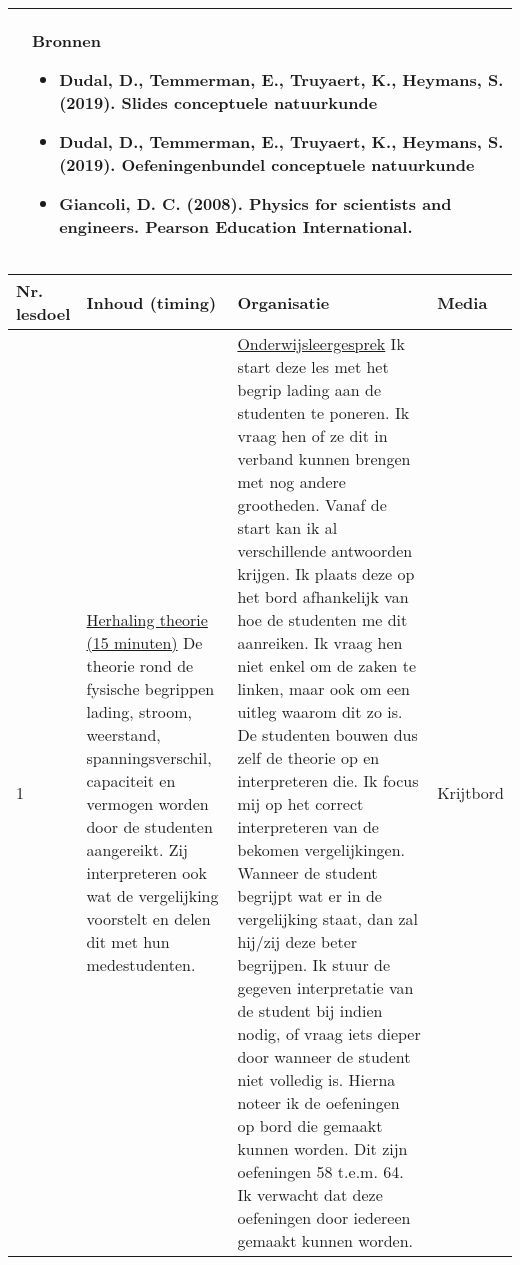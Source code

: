 \begin{landscape}
\begin{tabularx}{1.56\textwidth}{|p{}|X|}
		\\ \cline{2-2}
		  & \textbf{Bronnen}\begin{itemize}
		  	\item Dudal, D., Temmerman, E., Truyaert, K., Heymans, S. (2019). Slides conceptuele natuurkunde
		  	\item Dudal, D., Temmerman, E., Truyaert, K., Heymans, S. (2019). Oefeningenbundel conceptuele natuurkunde
		  	\item Giancoli, D. C. (2008). Physics for scientists and engineers. Pearson Education International.
		  \end{itemize}\\ \hline
	\end{tabularx}


\newpage
	
	\begin{tabularx}{1.56\textwidth}{|p{1.5cm}|p{6cm}|X|p{4cm}|}
		\hline
		\textbf{Nr. lesdoel } & \textbf{Inhoud (timing)}  & \textbf{Organisatie } & \textbf{Media } \\ \hline
		1 &\underline{Herhaling theorie (15 minuten)}\newline
		De theorie rond de fysische begrippen lading, stroom, weerstand, spanningsverschil, capaciteit en vermogen worden door de studenten aangereikt. Zij interpreteren ook wat de vergelijking voorstelt en delen dit met hun medestudenten. 
		&  \underline{Onderwijsleergesprek}\newline 
		Ik start deze les met het begrip lading aan de studenten te poneren. Ik vraag hen of ze dit in verband kunnen brengen met nog andere grootheden. Vanaf de start kan ik al verschillende antwoorden krijgen. Ik plaats deze op het bord afhankelijk van hoe de studenten me dit aanreiken. Ik vraag hen niet enkel om de zaken te linken, maar ook om een uitleg waarom dit zo is. De studenten bouwen dus zelf de theorie op en interpreteren die. \newline
		Ik focus mij op het correct interpreteren van de bekomen vergelijkingen. Wanneer de student begrijpt wat er in de vergelijking staat, dan zal hij/zij deze beter begrijpen. Ik stuur de gegeven interpretatie van de student bij indien nodig, of vraag iets dieper door wanneer de student niet volledig is. 
		\newline 
		Hierna noteer ik de oefeningen op bord die gemaakt kunnen worden. Dit zijn oefeningen 58 t.e.m. 64. Ik verwacht dat deze oefeningen door iedereen gemaakt kunnen worden.  
		& Krijtbord
		\\ \hline
	\end{tabularx}




\end{landscape}
